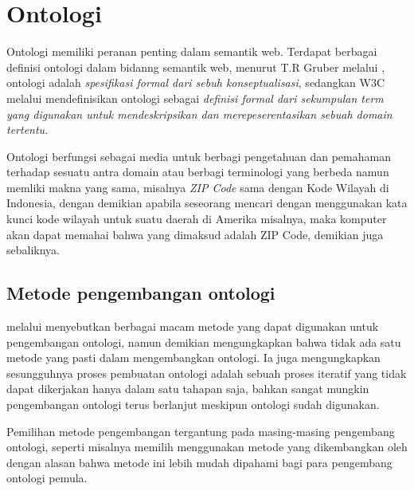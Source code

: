 \section{Ontologi}
Ontologi memiliki peranan penting dalam semantik web. Terdapat berbagai definisi ontologi dalam bidanng semantik web, menurut T.R Gruber melalui \citet*{antoniou}, ontologi adalah \emph{spesifikasi formal dari sebuh konseptualisasi}, sedangkan W3C melalui \citet{liyang_yu} mendefinisikan ontologi sebagai \emph{definisi formal dari sekumpulan term yang digunakan untuk mendeskripsikan dan merepeserentasikan sebuah domain tertentu.}

Ontologi berfungsi sebagai media untuk berbagi pengetahuan dan pemahaman terhadap sesuatu antra domain atau berbagi terminologi yang berbeda namun memliki makna yang sama, misalnya \emph{ZIP Code} sama dengan Kode Wilayah di Indonesia, dengan demikian apabila seseorang mencari dengan menggunakan kata kunci kode wilayah untuk suatu daerah di Amerika misalnya, maka komputer akan dapat memahai bahwa yang dimaksud adalah ZIP Code, demikian juga sebaliknya.

\subsection{Metode pengembangan ontologi}
\citet{fernandez_lopez} melalui \citet*{fonou_huisman} menyebutkan berbagai macam metode yang dapat digunakan untuk pengembangan ontologi, namun demikian \citet{noy_mcguinness} mengungkapkan bahwa tidak ada satu metode yang pasti dalam mengembangkan ontologi. Ia juga mengungkapkan sesungguhnya proses pembuatan ontologi adalah sebuah proses iteratif yang tidak dapat dikerjakan hanya dalam satu tahapan saja, bahkan sangat mungkin pengembangan ontologi terus berlanjut meskipun ontologi sudah digunakan. 

Pemilihan metode pengembangan tergantung pada masing-masing pengembang ontologi, seperti misalnya \citet*{fonou_huisman} memilih menggunakan metode yang dikembangkan oleh \citet*{uschold_king} dengan alasan bahwa metode ini lebih mudah dipahami bagi para pengembang ontologi pemula.

